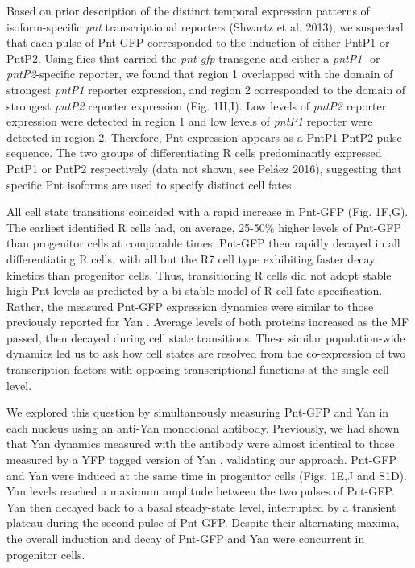 Based on prior description of the distinct temporal expression patterns of isoform-specific \textit{pnt} transcriptional reporters (Shwartz et al. 2013), we suspected that each pulse of Pnt-GFP corresponded to the induction of either PntP1 or PntP2. Using flies that carried the \textit{pnt-gfp} transgene and either a \textit{pntP1-} or \textit{pntP2}-specific reporter, we found that region 1 overlapped with the domain of strongest \textit{pntP1} reporter expression, and region 2 corresponded to the domain of strongest \textit{pntP2} reporter expression (Fig. 1H,I). Low levels of \textit{pntP2} reporter expression were detected in region 1 and low levels of \textit{pntP1} reporter were detected in region 2. Therefore, Pnt expression appears as a PntP1-PntP2 pulse sequence. The two groups of differentiating R cells predominantly expressed PntP1 or PntP2 respectively (data not shown, see Peláez 2016), suggesting that specific Pnt isoforms are used to specify distinct cell fates.

All cell state transitions coincided with a rapid increase in Pnt-GFP (Fig. 1F,G). The earliest identified R cells had, on average, 25-50\% higher levels of Pnt-GFP than progenitor cells at comparable times. Pnt-GFP then rapidly decayed in all differentiating R cells, with all but the R7 cell type exhibiting faster decay kinetics than progenitor cells. Thus, transitioning R cells did not adopt stable high Pnt levels as predicted by a bi-stable model of R cell fate specification. Rather, the measured Pnt-GFP expression dynamics were similar to those previously reported for Yan \cite{Pelaez2015}. Average levels of both proteins increased as the MF passed, then decayed during cell state transitions. These similar population-wide dynamics led us to ask how cell states are resolved from the co-expression of two transcription factors with opposing transcriptional functions at the single cell level.

We explored this question by simultaneously measuring Pnt-GFP and Yan in each nucleus using an anti-Yan monoclonal antibody. Previously, we had shown that Yan dynamics measured with the antibody were almost identical to those measured by a YFP tagged version of Yan \cite{Pelaez2015}, validating our approach. Pnt-GFP and Yan were induced at the same time in progenitor cells (Figs. 1E,J and S1D). Yan levels reached a maximum amplitude between the two pulses of Pnt-GFP. Yan then decayed back to a basal steady-state level, interrupted by a transient plateau during the second pulse of Pnt-GFP. Despite their alternating maxima, the overall induction and decay of Pnt-GFP and Yan were concurrent in progenitor cells.

